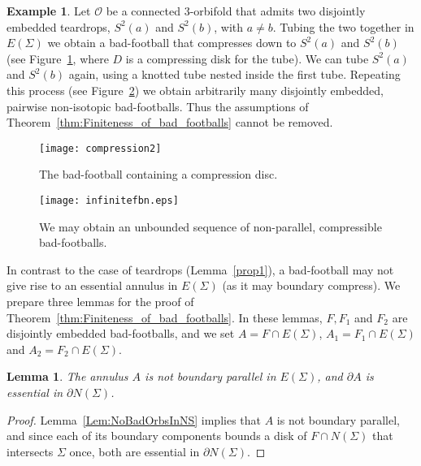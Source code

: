 \documentclass[12pt,reqno]{amsart}
\theoremstyle{plain}
\theoremstyle{definition}
\numberwithin{subcase}{case}
\theoremstyle{plain}
\newtheorem{lemm}[thm]{Lemma}
\theoremstyle{definition}
\newtheorem{ex}[thm]{Example}
\def\scl[#1][#2]{{\scalebox{#1}{#2}}}
\newcommand{\OO}{\mathcal{O}}
\begin{document}
\begin{ex}
\label{ExampleOfInfinitelyManyTears} 
Let \(\OO\) be a connected 3-orbifold that admits two disjointly embedded teardrops, $S^2(a)$ and $S^2(b)$, with \(a \neq b\).  Tubing the two together in \(E(\Sigma)\) we obtain a bad-football that compresses down to $S^2(a)$ and $S^2(b)$ (see Figure~\ref{compression}, where \(D\) is a compressing disk for the tube).  We can tube $S^2(a)$ and $S^2(b)$ again, using a knotted tube nested inside the first tube.  Repeating this process (see Figure~\ref{infinitelyfb}) we obtain arbitrarily many disjointly embedded, pairwise non-isotopic bad-footballs.  Thus the assumptions of Theorem~\ref{thm:Finiteness_of_bad_footballs} cannot be removed.  

\begin{figure}[h!]
\psfrag{s}{\scl[.7][$\Sigma$]}
\psfrag{a}{\scl[.7][$a$]}
\psfrag{b}{\scl[.7][$b$]}
\psfrag{D}{\scl[.7][$D$]}
\centerline{\texttt{[image: compression2]}}
\caption{The bad-football containing a compression disc.}
\label{compression}
\end{figure}

\begin{figure}[h!]
\psfrag{s}{\scl[.7][$\Sigma$]}
\psfrag{D}{\scl[.7][$D$]}
\hspace{-6cm}
\centerline{\texttt{[image: infinitefbn.eps]}}
\caption{We may obtain an unbounded sequence of non-parallel, compressible bad-footballs.}
\label{infinitelyfb}
\end{figure}
\end{ex}

In contrast to the case of teardrops (Lemma~\ref{prop1}), a bad-football may not give rise to an essential annulus in \(E(\Sigma)\) (as it may boundary compress). We prepare three lemmas for the proof of Theorem~\ref{thm:Finiteness_of_bad_footballs}. In these lemmas, \(F,F_{1}\) and \(F_{2}\) are disjointly embedded bad-footballs, and we set \(A = F \cap E(\Sigma)\), $A_1= F_1\cap E(\Sigma)$ and $A_2 = F_2\cap E(\Sigma)$.

\begin{lemm}
\label{lem:FootballAnnulusNotBoundaryParallel}
The annulus $A$ is not boundary parallel in \(E(\Sigma)\), and \(\partial A\) is essential in \(\partial N(\Sigma)\).
\end{lemm}

\begin{proof}
Lemma~\ref{Lem:NoBadOrbsInNS} implies that \(A\) is not boundary parallel, and since each of its boundary components bounds a disk
of \(F \cap N(\Sigma)\) 
that intersects \(\Sigma\) once, both are essential in \(\partial N(\Sigma)\).
\end{proof}
\end{document}
